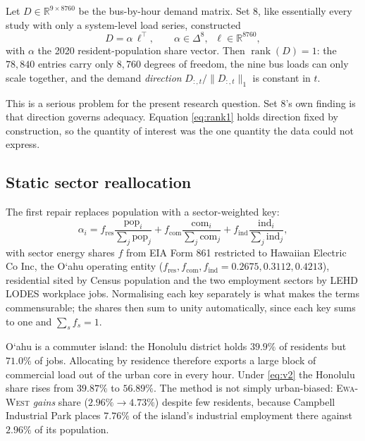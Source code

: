 \documentclass[11pt,a4paper]{article}
\theoremstyle{definition}
\theoremstyle{plain}
\theoremstyle{remark}
\newcommand{\R}{\mathbb{R}}
\newcommand{\rank}{\operatorname{rank}}
\newcommand{\okina}{\textquoteleft}
\newcommand{\Oahu}{O\okina ahu}
\begin{document}
Let $D \in \R^{9 \times 8760}$ be the bus-by-hour demand matrix. Set 8, like
essentially every study with only a system-level load series, constructed
\begin{equation}
  D = \alpha\, \ell^{\top}, \qquad \alpha \in \Delta^{8}, \;\; \ell \in \R^{8760},
\label{eq:rank1}
\end{equation}
with $\alpha$ the 2020 resident-population share vector. Then
$\rank(D) = 1$: the $78{,}840$ entries carry only $8{,}760$ degrees of freedom,
the nine bus loads can only scale together, and the demand \emph{direction}
$D_{:,t}/\|D_{:,t}\|_1$ is constant in $t$.

This is a serious problem for the present research question. Set 8's own
finding is that direction governs adequacy. Equation \eqref{eq:rank1} holds
direction fixed by construction, so the quantity of interest was the one
quantity the data could not express.

\subsection{Static sector reallocation}

The first repair replaces population with a sector-weighted key:
\begin{equation}
  \alpha_i = f_{\mathrm{res}}\frac{\mathrm{pop}_i}{\sum_j \mathrm{pop}_j}
           + f_{\mathrm{com}}\frac{\mathrm{com}_i}{\sum_j \mathrm{com}_j}
           + f_{\mathrm{ind}}\frac{\mathrm{ind}_i}{\sum_j \mathrm{ind}_j},
\label{eq:v2}
\end{equation}
with sector energy shares $f$ from EIA Form 861 restricted to Hawaiian Electric
Co Inc, the \Oahu{} operating entity ($f_{\mathrm{res}},f_{\mathrm{com}},
f_{\mathrm{ind}} = 0.2675, 0.3112, 0.4213$), residential sited by Census
population and the two employment sectors by LEHD LODES workplace jobs.
Normalising each key separately is what makes the terms commensurable; the
shares then sum to unity automatically, since each key sums to one and
$\sum_s f_s = 1$.

\Oahu{} is a commuter island: the Honolulu district holds $39.9\%$ of residents
but $71.0\%$ of jobs. Allocating by residence therefore exports a large block of
commercial load out of the urban core in every hour. Under \eqref{eq:v2} the
Honolulu share rises from $39.87\%$ to $56.89\%$. The method is not simply
urban-biased: \textsc{Ewa-West} \emph{gains} share ($2.96\% \to 4.73\%$) despite
few residents, because Campbell Industrial Park places $7.76\%$ of the island's
industrial employment there against $2.96\%$ of its population.
\end{document}
